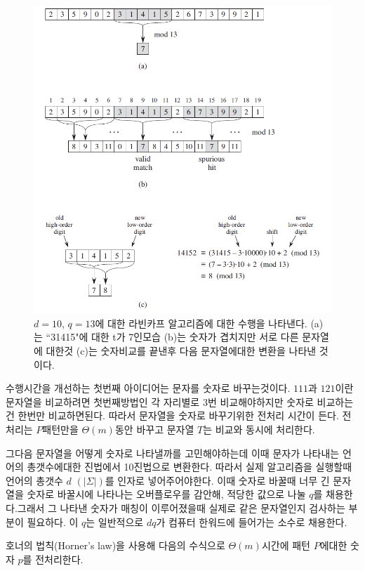 \begin{figure}[h!]
    \centering
    \includegraphics[scale=0.6]{pic1.PNG}
    \caption{$d = 10$, $q = 13$에 대한 라빈카프 알고리즘에 대한 수행을 나타낸다. (a)는 ``31415"에 대한 t가 7인모습 (b)는 숫자가 겹치지만 서로 다른 문자열에 대한것 (c)는 숫자비교를 끝낸후 다음 문자열에대한 변환을 나타낸 것이다.}
\end{figure}


수행시간을 개선하는 첫번째 아이디어는 문자를 숫자로 바꾸는것이다.
$111$과 $121$이란 문자열을 비교하려면 첫번째방법인 각 자리별로 3번 비교해야하지만 숫자로 비교하는건 한번만 비교하면된다.
따라서 문자열을 숫자로 바꾸기위한 전처리 시간이 든다.
전처리는 $P$패턴만을 $\Theta(m)$동안 바꾸고 문자열 $T$는 비교와 동시에 처리한다.

그다음 문자열을 어떻게 숫자로 나타낼까를 고민해야하는데 이때 문자가 나타내는 언어의 총갯수에대한 진법에서 10진법으로 변환한다. 따라서 실제 알고리즘을 실행할때 언어의 총갯수 $d$ $(|\Sigma|)$를 인자로 넣어주어야한다.
이때 숫자로 바꿀때 너무 긴 문자열을 숫자로 바꿀시에 나타나는 오버플로우를 감안해, 적당한 값으로 나눌 $q$를 채용한다.그래서 그 나타낸 숫자가 매칭이 이루어졌을때 실제로 같은 문자열인지 검사하는 부분이 필요하다. 이 $q$는 일반적으로 $dq$가 컴퓨터 한워드에 들어가는 소수로 채용한다.

호너의 법칙(Horner's law)을 사용해 다음의 수식으로 $\Theta(m)$시간에 패턴 $P$에대한 숫자 $p$를 전처리한다.

